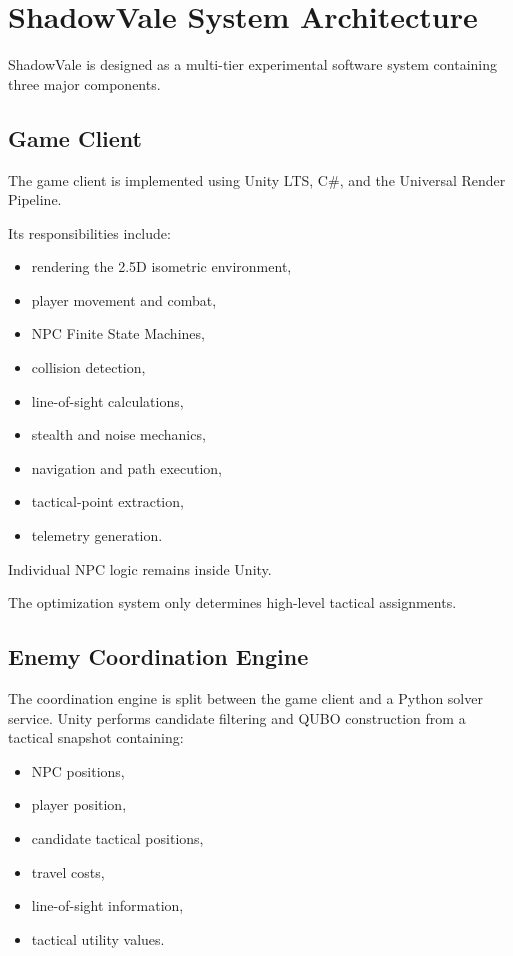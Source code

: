 \documentclass[12pt, a4paper]{article}
\begin{document}
\section*{ShadowVale System Architecture}

ShadowVale is designed as a multi-tier experimental software system containing three major components.

\subsection*{Game Client}

The game client is implemented using Unity LTS, C\#, and the Universal Render Pipeline.

Its responsibilities include:

\begin{itemize}
\item rendering the 2.5D isometric environment,
\item player movement and combat,
\item NPC Finite State Machines,
\item collision detection,
\item line-of-sight calculations,
\item stealth and noise mechanics,
\item navigation and path execution,
\item tactical-point extraction,
\item telemetry generation.
\end{itemize}

Individual NPC logic remains inside Unity.

The optimization system only determines high-level tactical assignments.

\subsection*{Enemy Coordination Engine}

The coordination engine is split between the game client and a Python solver service. Unity performs candidate filtering and QUBO construction from a tactical snapshot containing:

\begin{itemize}
\item NPC positions,
\item player position,
\item candidate tactical positions,
\item travel costs,
\item line-of-sight information,
\item tactical utility values.
\end{itemize}
\end{document}
